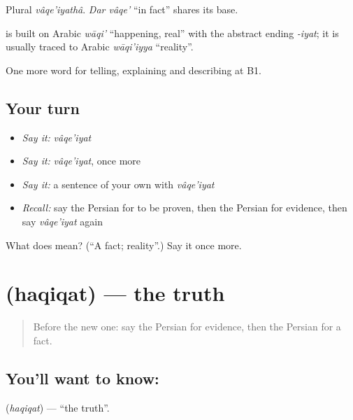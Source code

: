 Plural \emph{vâqe'iyathâ}. \emph{Dar vâqe'} \textquotedblleft{}in fact\textquotedblright{} shares its base.

\begin{cousinweb}
\textbf{} is built on Arabic \emph{wāqi'} \textquotedblleft{}happening, real\textquotedblright{} with the abstract ending \emph{-iyat}; it is usually traced to Arabic \emph{wāqi'iyya} \textquotedblleft{}reality\textquotedblright{}.
\end{cousinweb}

\begin{grammarlens}[title={What you've built}]
One more word for telling, explaining and describing at B1.
\end{grammarlens}

\subsection*{Your turn}
\begin{itemize}
\raggedright
  \item \emph{Say it:} \emph{vâqe'iyat}
  \item \emph{Say it:} \emph{vâqe'iyat}, once more
  \item \emph{Say it:} a sentence of your own with \emph{vâqe'iyat}
  \item \emph{Recall:} say the Persian for to be proven, then the Persian for evidence, then say \emph{vâqe'iyat} again
\end{itemize}

\begin{tcolorbox}[breakable,colback=teal!4,colframe=teal!35!black,title={Before you move on}]
What does  mean? (\textquotedblleft{}A fact; reality\textquotedblright{}.) Say it once more.
\end{tcolorbox}
\section[\texorpdfstring{\fa{حقیقت} (haqiqat)}{حقیقت (haqiqat)}]{ (haqiqat) — the truth}

\label{lesson:FA-C364-haqiqat}



\begin{quote}
Before the new one: say the Persian for evidence, then the Persian for a fact.
\end{quote}

\subsection*{You'll want to know: }
\textbf{} (\emph{haqiqat}) — \textquotedblleft{}the truth\textquotedblright{}.

